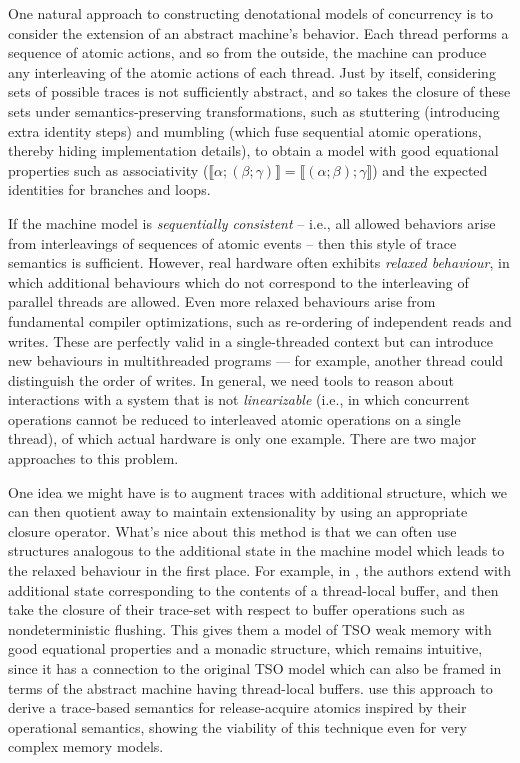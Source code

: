 \documentclass[acmsmall,screen,review]{acmart}
\newcommand{\dnt}[1]{\llbracket{#1}\rrbracket}
\begin{document}
One natural approach to constructing denotational models of concurrency is to consider the
extension of an abstract machine's behavior. Each thread performs a sequence of atomic actions,
and so from the outside, the machine can produce any interleaving of the atomic actions of each
thread. Just by itself, considering sets of possible traces is not sufficiently abstract, and so
\citet{brookes-full-abstraction-96} takes the closure of these sets under semantics-preserving
transformations, such as stuttering (introducing extra identity steps) and mumbling (which fuse
sequential atomic operations, thereby hiding implementation details), to obtain a model with good
equational properties such as associativity
($\dnt{\alpha;(\beta;\gamma)} = \dnt{(\alpha;\beta);\gamma}$) and the expected identities for
branches and loops. 

If the machine model is \emph{sequentially consistent} -- i.e., all allowed behaviors arise from
interleavings of sequences of atomic events -- then this style of trace semantics is sufficient.
However, real hardware often exhibits \emph{relaxed behaviour}, in which additional behaviours
which do not correspond to the interleaving of parallel threads are allowed. Even more relaxed
behaviours arise from fundamental compiler optimizations, such as re-ordering of independent reads
and writes. These are perfectly valid in a single-threaded context but can introduce new
behaviours in multithreaded programs — for example, another thread could distinguish the order of
writes. In general, we need tools to reason about interactions with a system that is not
\emph{linearizable} (i.e., in which concurrent operations cannot be reduced to interleaved atomic
operations on a single thread), of which actual hardware is only one example. There are two major
approaches to this problem.

One idea we might have is to augment traces with additional structure, which we can then quotient
away to maintain extensionality by using an appropriate closure operator. What's nice about this
method is that we can often use structures analogous to the additional state in the machine model
which leads to the relaxed behaviour in the first place. For example, in
\citet{jagadeesan-brookes-relaxed-12}, the authors extend \citet{brookes-full-abstraction-96} with
additional state corresponding to the contents of a thread-local buffer, and then take the closure
of their trace-set with respect to buffer operations such as nondeterministic flushing. This gives
them a model of TSO weak memory with good equational properties and a monadic structure, which
remains intuitive, since it has a connection to the original TSO model which can also be framed in
terms of the abstract machine having thread-local buffers. \citet{release-acquire} use this approach
to derive a trace-based semantics for release-acquire atomics inspired by their operational
semantics, showing the viability of this technique even for very complex memory models.
\end{document}
